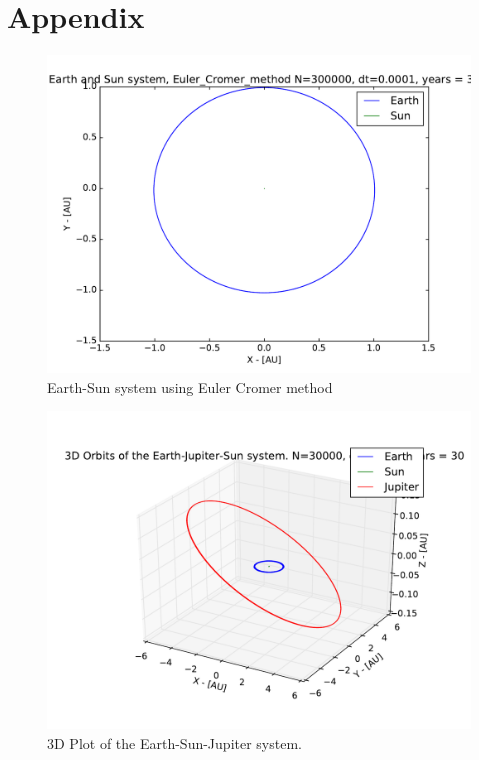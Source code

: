 \documentclass[12pt]{article}
\begin{document}
\section*{Appendix}
\begin{figure}[hbtp]
\centering
\includegraphics[width=\linewidth]{Plots/Earth_Sun_Euler_Cromer_method.pdf}
\caption{Earth-Sun system using Euler Cromer method}
\end{figure}

\begin{figure}[hbtp]
\centering
\includegraphics[width=\linewidth]{Plots/Earth_Sun_Jupiter_3D.pdf}
\caption{3D Plot of the Earth-Sun-Jupiter system.}
\end{figure}
\end{document}
